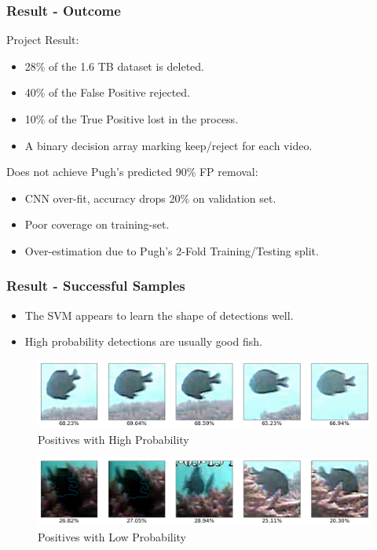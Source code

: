 \documentclass{beamer}[fullspacing]
\begin{document}
\begin{frame}
\frametitle{Result - Outcome}

Project Result:
\begin{itemize}
\item
28\% of the 1.6 TB dataset is deleted.
\item
40\% of the False Positive rejected.
\item
10\% of the True Positive lost in the process.
\item
A binary decision array marking keep/reject for each video.
\end{itemize}

Does not achieve Pugh's predicted 90\% FP removal:
\begin{itemize}
\item
CNN over-fit, accuracy drops 20\% on validation set.
\item
Poor coverage on training-set.
\item
Over-estimation due to Pugh's 2-Fold Training/Testing split.
\end{itemize}
\end{frame}



\begin{frame}
\frametitle{Result - Successful Samples}

\begin{itemize}
\item
The SVM appears to learn the shape of detections well.
\item
High probability detections are usually good fish.
\end{itemize}
\begin{figure}
\setlength{\abovecaptionskip}{-2pt}
\includegraphics[scale=0.25]{image/HP.png}
\caption{Positives with High Probability}
\end{figure}
\vspace{-10pt}
\begin{figure}
\setlength{\abovecaptionskip}{-2pt}
\includegraphics[scale=0.25]{image/LP.png}
\caption{Positives with Low Probability}
\end{figure}

\end{frame}
\end{document}

